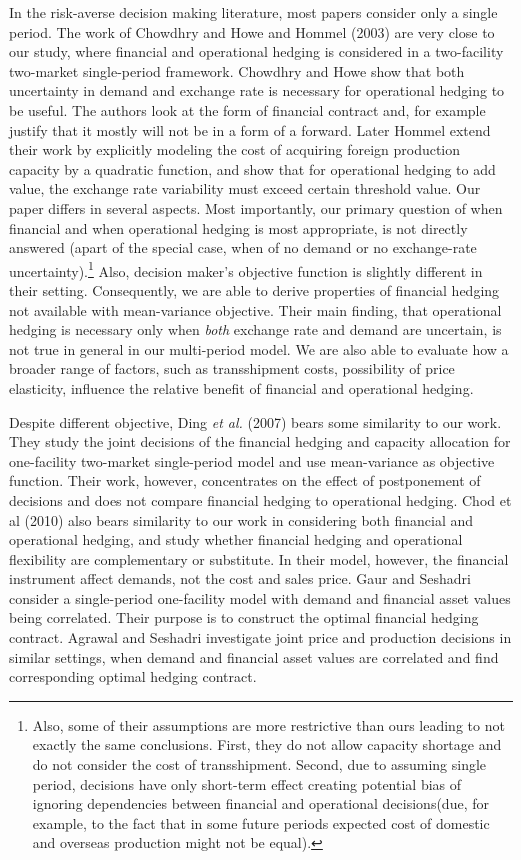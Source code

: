 \documentclass[mnsc,nonblindrev,copyedit]{informs2_wz} %
\begin{document}
In the risk-averse decision making literature, most papers consider only a single period.  The work of Chowdhry and Howe \cite{Chowdhry1999} and Hommel (2003) are very close to our study, where financial and operational hedging is considered in a two-facility two-market single-period framework.  Chowdhry and Howe show that both uncertainty in demand and exchange rate is necessary for operational hedging to be useful.  The authors look at the form of financial contract and, for example justify that it mostly will not be in a form of a forward. Later Hommel extend their work by explicitly modeling the cost of acquiring foreign production capacity by a quadratic function, and show that for operational hedging to add value, the exchange rate variability must exceed certain threshold value.  Our paper differs in several aspects.  Most importantly, our primary question of when financial and when operational hedging is most appropriate, is not directly answered (apart of the special case, when of no demand or no exchange-rate uncertainty).\footnote{Also, some of their assumptions are more restrictive than ours leading to not exactly the same conclusions.  First, they do not allow capacity shortage and do not consider the cost of transshipment.  Second, due to assuming single period, decisions have only short-term effect creating potential bias of ignoring dependencies between financial and operational decisions(due, for example, to the fact that in some future periods expected cost of domestic and overseas production might not be equal).}  Also, decision maker's objective function is slightly different in their setting.  Consequently, we are able to derive properties of financial hedging not available with mean-variance objective.  Their main finding, that operational hedging is necessary only when {\em both} exchange rate and demand are uncertain, is not true in general in our multi-period model.  We are also able to evaluate how a broader range of factors, such as transshipment costs, possibility of price elasticity, influence the relative benefit of financial and operational hedging.

Despite different objective, Ding {\it et al.} (2007) bears some similarity to our work.  They study the joint decisions of the financial hedging and capacity allocation for one-facility two-market single-period model and use mean-variance as objective function.  Their work, however, {concentrates} on the effect of postponement of decisions and does not compare financial hedging to operational hedging. Chod et al (2010) also bears similarity to our work in considering both financial and operational hedging, and study whether financial hedging and operational flexibility are complementary or substitute. In their model, however, the financial instrument affect demands, not the cost and sales price. Gaur and Seshadri \cite{Guar2004} consider a single-period one-facility model with demand and financial asset values being correlated.  Their purpose is to construct the optimal financial hedging contract.  Agrawal and Seshadri \cite{Agrawal2000} investigate joint price and production decisions in similar settings, when demand and financial asset values are correlated and find corresponding optimal hedging contract.
\end{document}
